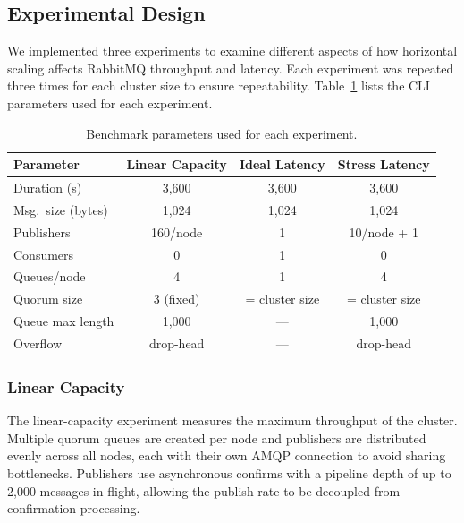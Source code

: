 \subsection{Experimental Design}

We implemented three experiments to examine different aspects of how horizontal scaling affects RabbitMQ throughput and latency. Each experiment was repeated three times for each cluster size to ensure repeatability. Table~\ref{tab:parameters} lists the CLI parameters used for each experiment.

\begin{table}[!ht]
\centering
\caption{Benchmark parameters used for each experiment.}
\label{tab:parameters}
\footnotesize
\setlength{\tabcolsep}{6pt}
\begin{tabular}{@{}l c c c@{}}
\textbf{Parameter} & \textbf{Linear Capacity} & \textbf{Ideal Latency} & \textbf{Stress Latency} \\
\hline
Duration (s)          & 3{,}600  & 3{,}600  & 3{,}600 \\
Msg.\ size (bytes)    & 1{,}024  & 1{,}024  & 1{,}024 \\
Publishers            & 160/node & 1        & 10/node + 1 \\
Consumers             & 0        & 1        & 0 \\
Queues/node           & 4        & 1        & 4 \\
Quorum size           & 3 (fixed) & = cluster size & = cluster size \\
Queue max length      & 1{,}000  & ---       & 1{,}000 \\
Overflow              & drop-head & ---      & drop-head \\
\hline
\end{tabular}
\end{table}

\subsubsection{Linear Capacity}
The linear-capacity experiment measures the maximum throughput of the cluster. Multiple quorum queues are created per node and publishers are distributed evenly across all nodes, each with their own AMQP connection to avoid sharing bottlenecks. Publishers use asynchronous confirms with a pipeline depth of up to 2{,}000 messages in flight, allowing the publish rate to be decoupled from confirmation processing.

